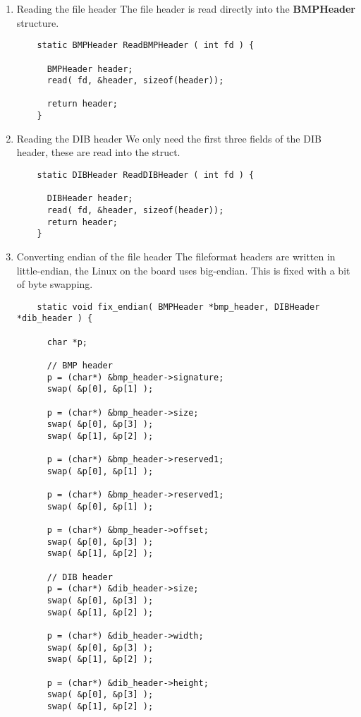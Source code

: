 \begin{enumerate}
\item Reading the file header \newline
The file header is read directly into the {\bf BMPHeader} structure.
  \begin{lstlisting}
    static BMPHeader ReadBMPHeader ( int fd ) {

      BMPHeader header;
      read( fd, &header, sizeof(header));

      return header;
    }
  \end{lstlisting}

\item Reading the DIB header \newline
We only need the first three fields of the DIB header, these are read
into the struct.
  \begin{lstlisting}
    static DIBHeader ReadDIBHeader ( int fd ) {

      DIBHeader header;
      read( fd, &header, sizeof(header));
      return header;
    }
  \end{lstlisting}

\item Converting endian of the file header \newline
The fileformat headers are written in little-endian, the Linux on the
board uses big-endian. This is fixed with a bit of byte swapping.
  \begin{lstlisting}
    static void fix_endian( BMPHeader *bmp_header, DIBHeader *dib_header ) {

      char *p;

      // BMP header
      p = (char*) &bmp_header->signature;
      swap( &p[0], &p[1] );

      p = (char*) &bmp_header->size;
      swap( &p[0], &p[3] );
      swap( &p[1], &p[2] );

      p = (char*) &bmp_header->reserved1;
      swap( &p[0], &p[1] );

      p = (char*) &bmp_header->reserved1;
      swap( &p[0], &p[1] );

      p = (char*) &bmp_header->offset;
      swap( &p[0], &p[3] );
      swap( &p[1], &p[2] );

      // DIB header
      p = (char*) &dib_header->size;
      swap( &p[0], &p[3] );
      swap( &p[1], &p[2] );

      p = (char*) &dib_header->width;
      swap( &p[0], &p[3] );
      swap( &p[1], &p[2] );

      p = (char*) &dib_header->height;
      swap( &p[0], &p[3] );
      swap( &p[1], &p[2] );


\end{lstlisting}
\end{enumerate}
